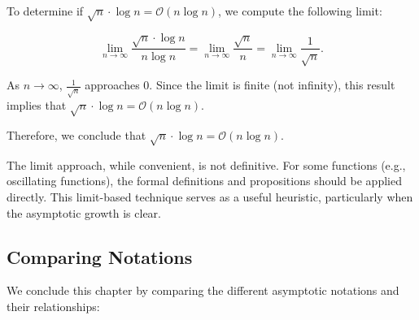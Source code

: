         \begin{solution}
            To determine if $\sqrt{n} \cdot \log n = \mathcal{O}(n \log n)$, we compute the following limit:
            
            \[
            \lim_{n \to \infty} \frac{\sqrt{n} \cdot \log n}{n \log n} = \lim_{n \to \infty} \frac{\sqrt{n}}{n} = \lim_{n \to \infty} \frac{1}{\sqrt{n}}.
            \]
        
            As $n \to \infty$, $\frac{1}{\sqrt{n}}$ approaches $0$. Since the limit is finite (not infinity), this result implies that $\sqrt{n} \cdot \log n = \mathcal{O}(n \log n)$.
        
            Therefore, we conclude that $\sqrt{n} \cdot \log n = \mathcal{O}(n \log n)$.
        \end{solution}
        
        The limit approach, while convenient, is not definitive. For some functions (e.g., oscillating functions), the formal definitions and propositions should be applied directly. This limit-based technique serves as a useful heuristic, particularly when the asymptotic growth is clear.
    
\subsection*{Comparing Notations}
We conclude this chapter by comparing the different asymptotic notations and their relationships:

